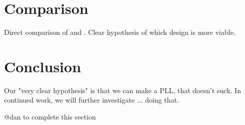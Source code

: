 \documentclass{IEEEtran}
\begin{document}
\section{Comparison}
Direct comparison of \cite{hashimoto2018} and \cite{wilcox2015}. Clear hypothesis of which design is more viable.

\section{Conclusion}

Our "very clear hypothesis" is that we can make a PLL, that doesn't suck. 
In continued work, we will further investigate ... doing that.

@dan to complete this section


\begingroup
\raggedright

\endgroup
\end{document}
